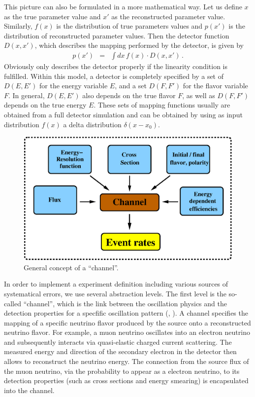 This picture can also be formulated in a more mathematical way. Let us define $x$ as the true parameter value and $x'$ as the reconstructed parameter value. Similarly, $f(x)$ is the distribution of true parameters values and $p(x')$ is the distribution of reconstructed parameter values. Then the detector function  $D(x,x')$, which describes the mapping performed by the detector, is given by
\begin{eqnarray}
\label{equ:mapping}
p(x')&=&\int dx\, f(x)\cdot D(x,x')\,.
\end{eqnarray}
Obviously  only describes the detector properly
if the linearity condition is fulfilled. Within this model, a detector
is completely specified by a set of $D(E,E')$ for the energy variable $E$,
and a set $D(F,F')$ for the flavor variable $F$. In general, $D(E,E')$ also depends on the true flavor $F$, as well as $D(F,F')$ depends on the true energy $E$. These sets of mapping functions usually are obtained from a 
full detector simulation and can be obtained by using as input 
distribution $f(x)$ a delta distribution $\delta(x-x_0)$.

\begin{figure}[t]
\begin{center}
\includegraphics[width=13cm]{AEDL1}
\end{center}
\caption{\label{fig:channel} General concept of a ``channel''.}
\end{figure}

In order to implement a experiment definition including various
sources of systematical errors, we use several abstraction levels. 
The first level is the so-called ``channel'', 
 which is the link between 
the oscillation physics and the detection properties for a specfific oscillation pattern (\cf, ). A channel specifies the mapping of a specific neutrino flavor produced by the source onto a reconstructed neutrino flavor.
For example, a muon neutrino oscillates into an electron neutrino and subsequently interacts via quasi-elastic charged current scattering. The measured energy and direction of
the secondary electron in the detector then allows to reconstruct the neutrino energy. The connection from the source flux of the muon neutrino, via the  probability to appear as a electron neutrino, to its detection properties (such as cross sections and energy smearing) is encapsulated into the channel.

